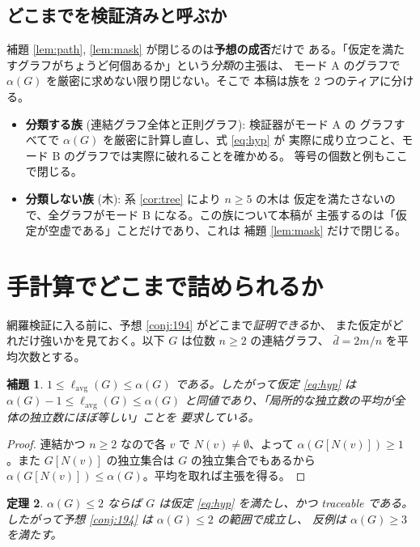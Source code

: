 \documentclass[paper=a4,fontsize=10.5pt,jafontsize=10.5pt]{jlreq}
\theoremstyle{plain}
\newtheorem{theorem}{定理}[section]
\newtheorem{lemma}[theorem]{補題}
\theoremstyle{definition}
\begin{document}
\subsection{どこまでを検証済みと呼ぶか}\label{sec:tier}

補題 \ref{lem:path}, \ref{lem:mask} が閉じるのは\textbf{予想の成否}だけで
ある。「仮定を満たすグラフがちょうど何個あるか」という\emph{分類}の主張は、
モード A のグラフで $\alpha(G)$ を厳密に求めない限り閉じない。そこで
本稿は族を 2 つのティアに分ける。

\begin{itemize}
\item \textbf{分類する族} (連結グラフ全体と正則グラフ): 検証器がモード A の
      グラフすべてで $\alpha(G)$ を厳密に計算し直し、式 \eqref{eq:hyp} が
      実際に成り立つこと、モード B のグラフでは実際に破れることを確かめる。
      等号の個数と例もここで閉じる。
\item \textbf{分類しない族} (木): 系 \ref{cor:tree} により $n \ge 5$ の木は
      仮定を満たさないので、全グラフがモード B になる。この族について本稿が
      主張するのは「仮定が空虚である」ことだけであり、これは
      補題 \ref{lem:mask} だけで閉じる。
\end{itemize}

\section{手計算でどこまで詰められるか}\label{sec:hand}

網羅検証に入る前に、予想 \ref{conj:194} がどこまで\emph{証明できる}か、
また仮定がどれだけ強いかを見ておく。以下 $G$ は位数 $n \ge 2$ の連結グラフ、
$\bar{d} = 2m/n$ を平均次数とする。

\begin{lemma}\label{lem:range}
$1 \le \ell_{\mathrm{avg}}(G) \le \alpha(G)$ である。したがって仮定
\eqref{eq:hyp} は $\alpha(G) - 1 \le \ell_{\mathrm{avg}}(G) \le \alpha(G)$
と同値であり、「局所的な独立数の平均が全体の独立数にほぼ等しい」ことを
要求している。
\end{lemma}

\begin{proof}
連結かつ $n \ge 2$ なので各 $v$ で $N(v) \ne \emptyset$、よって
$\alpha(G[N(v)]) \ge 1$。また $G[N(v)]$ の独立集合は $G$ の独立集合でもあるから
$\alpha(G[N(v)]) \le \alpha(G)$。平均を取れば主張を得る。
\end{proof}

\begin{theorem}\label{thm:alpha2}
$\alpha(G) \le 2$ ならば $G$ は仮定 \eqref{eq:hyp} を満たし、かつ traceable
である。したがって予想 \ref{conj:194} は $\alpha(G) \le 2$ の範囲で成立し、
反例は $\alpha(G) \ge 3$ を満たす。
\end{theorem}
\end{document}
